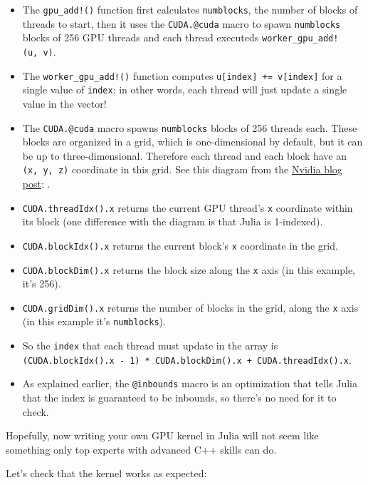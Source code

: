 \documentclass[11pt]{article}
\providecommand{\tightlist}{%
      \setlength{\itemsep}{0pt}\setlength{\parskip}{0pt}}
\begin{document}
\begin{itemize}
\tightlist
\item
  The \texttt{gpu\_add!()} function first calculates \texttt{numblocks},
  the number of blocks of threads to start, then it uses the
  \texttt{CUDA.@cuda} macro to spawn \texttt{numblocks} blocks of 256
  GPU threads and each thread executeds
  \texttt{worker\_gpu\_add!(u,\ v)}.
\item
  The \texttt{worker\_gpu\_add!()} function computes
  \texttt{u{[}index{]}\ +=\ v{[}index{]}} for a single value of
  \texttt{index}: in other words, each thread will just update a single
  value in the vector!
\item
  The \texttt{CUDA.@cuda} macro spawns \texttt{numblocks} blocks of 256
  threads each. These blocks are organized in a grid, which is
  one-dimensional by default, but it can be up to three-dimensional.
  Therefore each thread and each block have an \texttt{(x,\ y,\ z)}
  coordinate in this grid. See this diagram from the
  \href{https://developer.nvidia.com/blog/even-easier-introduction-cuda/}{Nvidia
  blog post}: .
\item
  \texttt{CUDA.threadIdx().x} returns the current GPU thread's
  \texttt{x} coordinate within its block (one difference with the
  diagram is that Julia is 1-indexed).
\item
  \texttt{CUDA.blockIdx().x} returns the current block's \texttt{x}
  coordinate in the grid.
\item
  \texttt{CUDA.blockDim().x} returns the block size along the \texttt{x}
  axis (in this example, it's 256).
\item
  \texttt{CUDA.gridDim().x} returns the number of blocks in the grid,
  along the \texttt{x} axis (in this example it's \texttt{numblocks}).
\item
  So the \texttt{index} that each thread must update in the array is
  \texttt{(CUDA.blockIdx().x\ -\ 1)\ *\ CUDA.blockDim().x\ +\ CUDA.threadIdx().x}.
\item
  As explained earlier, the \texttt{@inbounds} macro is an optimization
  that tells Julia that the index is guaranteed to be inbounds, so
  there's no need for it to check.
\end{itemize}

Hopefully, now writing your own GPU kernel in Julia will not seem like
something only top experts with advanced C++ skills can do.

    Let's check that the kernel works as expected:
\end{document}
